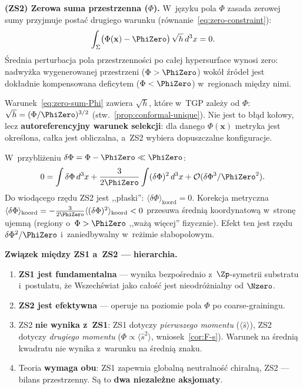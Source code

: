 \begin{remark}
\medskip\noindent
\textbf{(ZS2) Zerowa suma przestrzenna ($\Phi$).}
W~j\k{e}zyku pola $\Phi$ zasada zerowej sumy
przyjmuje posta\'c drugiego warunku
(r\'ownanie~\ref{eq:zero-constraint}):
\begin{equation}\label{eq:zero-sum-Phi}
    \int_\Sigma \bigl(\Phi(\mathbf{x}) - \PhiZero\bigr)\,
    \sqrt{h}\,d^3x = 0.
\end{equation}
\'Srednia perturbacja pola przestrzenno\'sci po ca\l{}ej
hypersurface wynosi zero: nadwy\.zka wygenerowanej
przestrzeni ($\Phi > \PhiZero$) wok\'o\l{} \'zr\'ode\l{}
jest dok\l{}adnie kompensowana deficytem
($\Phi < \PhiZero$) w~regionach mi\k{e}dzy nimi.

\begin{remark}[Autoreferencyjno\'s\'c ZS2]\label{rem:ZS2-self-ref}
Warunek~\eqref{eq:zero-sum-Phi} zawiera $\sqrt{h}$,
kt\'ore w~TGP zale\.zy od $\Phi$:
$\sqrt{h} = (\Phi/\PhiZero)^{3/2}$
(stw.~\ref{prop:conformal-unique}).
Nie jest to b\l{}\k{a}d ko\l{}owy, lecz
\textbf{autoreferencyjny warunek selekcji}:
dla danego $\Phi(\mathbf{x})$ metryka jest
okre\'slona, ca\l{}ka jest obliczalna,
a~ZS2 wybiera dopuszczalne konfiguracje.

W~przybli\.zeniu $\delta\Phi = \Phi - \PhiZero \ll \PhiZero$:
\begin{equation}\label{eq:ZS2-expansion}
  0 = \int\delta\Phi\,d^3x
    + \frac{3}{2\PhiZero}\int(\delta\Phi)^2\,d^3x
    + \mathcal{O}(\delta\Phi^3/\PhiZero^2).
\end{equation}
Do wiod\k{a}cego rz\k{e}du ZS2 jest ,,p\l{}aski'':
$\langle\delta\Phi\rangle_{\mathrm{koord}} = 0$.
Korekcja metryczna
$\langle\delta\Phi\rangle_{\mathrm{koord}}
= -\frac{3}{2\PhiZero}\langle(\delta\Phi)^2\rangle_{\mathrm{koord}}
< 0$
przesuwa \'sredni\k{a} koordynatow\k{a} w~stron\k{e} ujemn\k{a}
(regiony o~$\Phi > \PhiZero$ ,,wa\.z\k{a} wi\k{e}cej'' fizycznie).
Efekt ten jest rz\k{e}du $\delta\Phi^2/\PhiZero$
i~zaniedbywalny w~re\.zimie s\l{}abopolowym.
\end{remark}

\medskip\noindent
\textbf{Zwi\k{a}zek mi\k{e}dzy ZS1 a~ZS2 --- hierarchia.}
\begin{enumerate}[nosep]
  \item \textbf{ZS1 jest fundamentalna} --- wynika
    bezpo\'srednio z~$\Zp$-symetrii substratu i~postulatu,
    \.ze Wszech\'swiat jako ca\l{}o\'s\'c jest
    nieodr\'o\.znialny od $\Nzero$.
  \item \textbf{ZS2 jest efektywna} --- operuje na poziomie
    pola $\Phi$ po coarse-grainingu.
  \item ZS2 \textbf{nie wynika z~ZS1}: ZS1 dotyczy
    \emph{pierwszego momentu} ($\langle\hat{s}\rangle$),
    ZS2 dotyczy \emph{drugiego momentu}
    ($\Phi \propto \langle\hat{s}^2\rangle$,
    wniosek~\ref{cor:F-s}). Warunek na \'sredni\k{a}
    kwadratu nie wynika z~warunku na \'sredni\k{a} znaku.
  \item Teoria \textbf{wymaga obu}: ZS1 zapewnia globaln\k{a}
    neutralno\'s\'c chiralną, ZS2 --- bilans przestrzenny.
    S\k{a} to \textbf{dwa niezale\.zne aksjomaty}.
\end{enumerate}
\end{remark}


